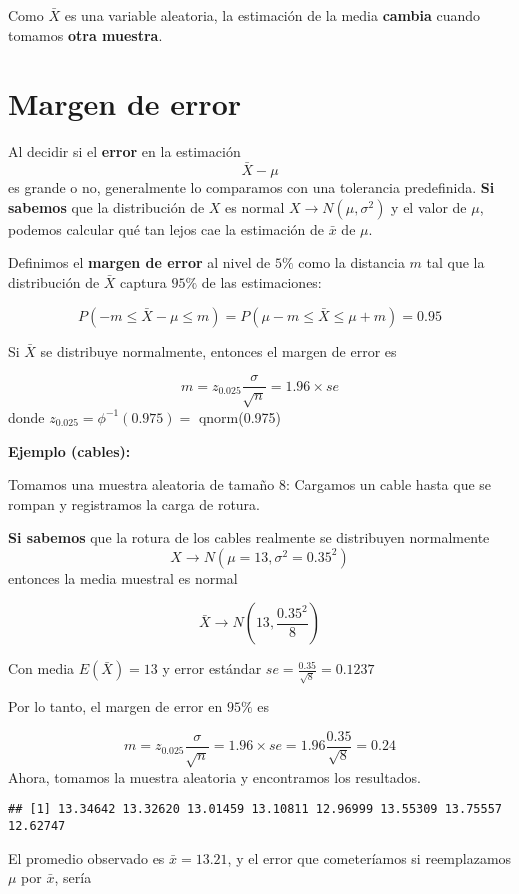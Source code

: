 \documentclass[
]{book}
\begin{document}
Como \(\bar{X}\) es una variable aleatoria, la estimación de la media \textbf{cambia} cuando tomamos \textbf{otra muestra}.

\hypertarget{margen-de-error-1}{%
\section{Margen de error}\label{margen-de-error-1}}

Al decidir si el \textbf{error} en la estimación \[\bar{X}-\mu\] es grande o no, generalmente lo comparamos con una tolerancia predefinida. \textbf{Si sabemos} que la distribución de \(X\) es normal \(X \rightarrow N(\mu, \sigma^2)\) y el valor de \(\mu\), podemos calcular qué tan lejos cae la estimación de \(\bar{x}\) de \(\mu\).

Definimos el \textbf{margen de error} al nivel de \(5\%\) como la distancia \(m\) tal que la distribución de \(\bar{X}\) captura \(95\%\) de las estimaciones:

\[P(-m \leq \bar{X}-\mu \leq m)=P(\mu-m \leq \bar{X} \leq\mu + m)=0.95\]

Si \(\bar{X}\) se distribuye normalmente, entonces el margen de error es

\[m=z_{0.025} \frac{\sigma}{\sqrt{n}}=1.96\times se\]
donde \(z_{0.025}=\phi^{-1}(0.975)=\) qnorm(0.975)

\textbf{Ejemplo (cables):}

Tomamos una muestra aleatoria de tamaño \(8\): Cargamos un cable hasta que se rompan y registramos la carga de rotura.

\textbf{Si sabemos} que la rotura de los cables realmente se distribuyen normalmente \[X \rightarrow N(\mu=13, \sigma^2=0.35^2)\] entonces la media muestral es normal

\[\bar{X} \rightarrow N(13, \frac{0.35^2}{8})\]

Con media \(E(\bar{X})=13\) y error estándar \(se=\frac{0.35}{\sqrt{8}}=0.1237\)

Por lo tanto, el margen de error en \(95\%\) es

\[m=z_{0.025} \frac{\sigma}{\sqrt{n}}=1.96\times se=1.96\frac{0.35}{\sqrt{8}}=0.24\]
Ahora, tomamos la muestra aleatoria y encontramos los resultados.

\begin{verbatim}
## [1] 13.34642 13.32620 13.01459 13.10811 12.96999 13.55309 13.75557 12.62747
\end{verbatim}

El promedio observado es \(\bar{x}=13.21\), y el error que cometeríamos si reemplazamos \(\mu\) por \(\bar{x}\), sería
\end{document}
